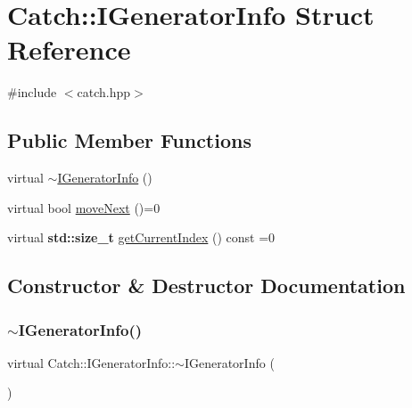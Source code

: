 \hypertarget{struct_catch_1_1_i_generator_info}{}\section{Catch\+:\+:I\+Generator\+Info Struct Reference}
\label{struct_catch_1_1_i_generator_info}


{\ttfamily \#include $<$catch.\+hpp$>$}

\subsection*{Public Member Functions}
\begin{DoxyCompactItemize}
\item 
virtual \hyperlink{struct_catch_1_1_i_generator_info_a9266aa62993298510c2a8b5948abb8e6}{$\sim$\+I\+Generator\+Info} ()
\item 
virtual bool \hyperlink{struct_catch_1_1_i_generator_info_a2b86711ca7009903edfe27ed62b515ef}{move\+Next} ()=0
\item 
virtual \textbf{ std\+::size\+\_\+t} \hyperlink{struct_catch_1_1_i_generator_info_a6a0dca712d31f6849fd9447b1344673a}{get\+Current\+Index} () const =0
\end{DoxyCompactItemize}


\subsection{Constructor \& Destructor Documentation}
\mbox{\label{struct_catch_1_1_i_generator_info_a9266aa62993298510c2a8b5948abb8e6}} 
\subsubsection{\texorpdfstring{$\sim$\+I\+Generator\+Info()}{~IGeneratorInfo()}}
{\footnotesize\ttfamily virtual Catch\+::\+I\+Generator\+Info\+::$\sim$\+I\+Generator\+Info (\begin{DoxyParamCaption}{ }\end{DoxyParamCaption})\hspace{0.3cm}{\ttfamily [virtual]}}



